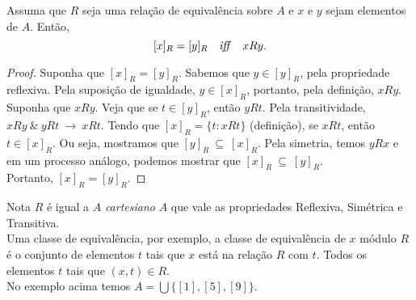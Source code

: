          \begin{theorem}
            Assuma que $R$ seja uma relação de equivalência sobre $A$ e $x$ e $y$ sejam elementos de $A$.
            Então,
            $$[x]_{R} = [y]_{R}\quad \textrm{\emph{iff}}\quad xRy.$$
            \begin{proof}
               Suponha que $[x]_{R} = [y]_{R}$. Sabemos que $y \in [y]_{R}$, pela propriedade reflexiva. Pela suposição de igualdade, $y \in [x]_{R}$, portanto, pela definição, $xRy$.
               Suponha que $xRy$. Veja que se $t \in [y]_{R}$, então $yRt$. Pela transitividade, $xRy\ \&\ yRt\ \rightarrow\ xRt$.
               Tendo que $[x]_{R} = \{t: xRt\}$ (definição), se $xRt$, então $t \in [x]_{R}$. Ou seja, mostramos que $[y]_{R}\ \subseteq\ [x]_{R}$.
               Pela simetria, temos $yRx$ e em um processo análogo, podemos mostrar que $[x]_{R}\ \subseteq\ [y]_{R}$.\\
               Portanto, $[x]_{R} = [y]_{R}$.
            \end{proof}
         \end{theorem}
         \newpage
         \begin{mymdframed}{Nota}  
            $R$ é igual a $A$ \emph{cartesiano} $A$ que vale as propriedades Reflexiva, Simétrica e Transitiva.\\
            Uma classe de equivalência, por exemplo, a classe de equivalência de $x$ módulo $R$ é o conjunto de elementos $t$ tais que $x$ está na relação $R$ com $t$. Todos os elementos $t$ tais que $( x, t ) \in R$.\\
            No exemplo acima temos $A = \bigcup\{[1], [5], [9]\}$.
         \end{mymdframed}

